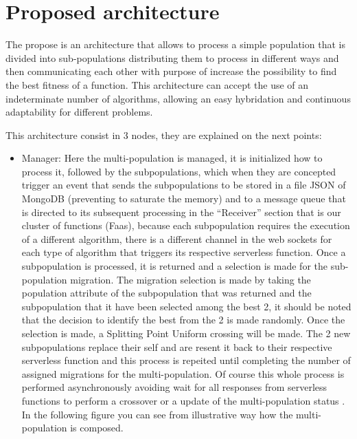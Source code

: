 \documentclass[runningheads]{llncs}
\begin{document}
\section{Proposed architecture}

The propose is an architecture that allows to process a simple population that is divided into sub-populations
distributing them to process in different ways and then communicating each other with purpose of increase the possibility
to find the best fitness of a function. This architecture can accept the use of an indeterminate number of algorithms, allowing
an easy hybridation and continuous adaptability for different problems.

This architecture consist in 3 nodes, they are explained on the next points:

\begin{itemize}
  \item Manager: Here the multi-population is managed, it is initialized how to process it, 
  followed by the subpopulations, which when they are concepted trigger an event that sends 
  the subpopulations to be stored in a file JSON of MongoDB (preventing to saturate the memory) 
  and to a message queue that is directed to its subsequent processing in the “Receiver” section 
  that is our cluster of functions (Faas), because each subpopulation requires the execution of a 
  different algorithm, there is a different channel in the web sockets for each type of algorithm 
  that triggers its respective serverless function.
  Once a subpopulation is processed, it is returned and a selection is made for the sub-population 
  migration. The migration selection is made by taking the population attribute of the subpopulation 
  that was returned and the subpopulation that it have been selected among the best 2, it should be 
  noted that the decision to identify the best from the 2 is made randomly. Once the selection is made, 
  a Splitting Point Uniform crossing will be made.
  The 2 new subpopulations replace their self and are resent it back to their respective
serverless function and this process is repeited until completing the number of assigned migrations
for the multi-population. Of course this whole process is performed asynchronously avoiding wait for all responses from serverless functions to perform a crossover or a
update of the multi-population status \cite{Lovbjerg2001,Jimeno2019}. In the following figure you can see from
illustrative way how the multi-population is composed.
\begin{figure}[htp]
  \centering

\end{figure}
\end{itemize}
\end{document}

